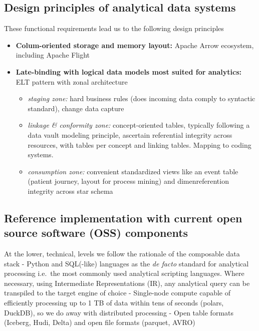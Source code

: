 \documentclass[
  letterpaper,
  DIV=11,
  numbers=noendperiod]{scrartcl}
\providecommand{\tightlist}{%
  \setlength{\itemsep}{0pt}\setlength{\parskip}{0pt}}\usepackage{longtable,booktabs,array}
\begin{document}
\subsection{Design principles of analytical data
systems}\label{design-principles-of-analytical-data-systems}

These functional requirements lead us to the following design principles

\begin{itemize}
\tightlist
\item
  \textbf{Colum-oriented storage and memory layout:} Apache Arrow
  ecosystem, including Apache Flight
\item
  \textbf{Late-binding with logical data models most suited for
  analytics:} ELT pattern with zonal architecture

  \begin{itemize}
  \tightlist
  \item
    \emph{staging zone:} hard business rules (does incoming data comply
    to syntactic standard), change data capture
  \item
    \emph{linkage \& conformity zone:} concept-oriented tables,
    typically following a data vault modeling principle, ascertain
    referential integrity across resources, with tables per concept and
    linking tables. Mapping to coding systems.
  \item
    \emph{consumption zone:} convenient standardized views like an event
    table (patient journey, layout for process mining) and
    dimenreferention integrity across star schema
  \end{itemize}
\end{itemize}

\subsection{Reference implementation with current open source software
(OSS)
components}\label{reference-implementation-with-current-open-source-software-oss-components}

At the lower, technical, levels we follow the rationale of the
composable data stack - Python and SQL(-like) languages as the \emph{de
facto} standard for analytical processing i.e.~the most commonly used
analytical scripting languages. Where necessary, using Intermediate
Representations (IR), any analytical query can be transpiled to the
target engine of choice - Single-node compute capable of efficiently
processing up to 1 TB of data within tens of seconds (polars, DuckDB),
so we do away with distributed processing - Open table formats (Iceberg,
Hudi, Delta) and open file formats (parquet, AVRO)
\end{document}
